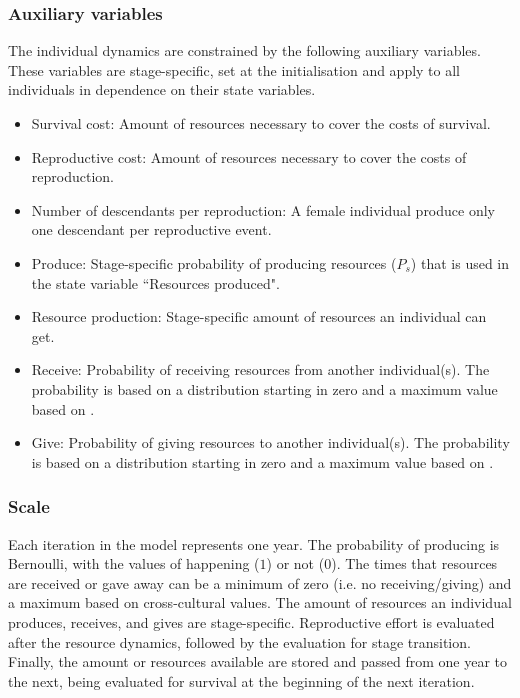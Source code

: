 \documentclass{article}
\begin{document}
\subsubsection{Auxiliary variables}

The individual dynamics are constrained by the following auxiliary variables. These variables are stage-specific, set at the initialisation and apply to all individuals in dependence on their state variables.

\begin{itemize}
    \item Survival cost: Amount of resources necessary to cover the costs of survival.
    \item Reproductive cost: Amount of resources necessary to cover the costs of reproduction.
    \item Number of descendants per reproduction: A female individual produce only one descendant per reproductive event.
    \item Produce: Stage-specific probability of producing resources ($P_s$) that is used in the state variable ``Resources produced".
    \item Resource production: Stage-specific amount of resources an individual can get.
    \item Receive: Probability of receiving resources from another individual(s). The probability is based on a distribution starting in zero and a maximum value based on \cite{gurven2004give}.
    \item Give: Probability of giving resources to another individual(s). The probability is based on a distribution starting in zero and a maximum value based on \cite{gurven2004give}.
\end{itemize}

\subsubsection{Scale}

Each iteration in the model represents one year. The probability  of producing is Bernoulli, with the values of happening ($1$) or not ($0$). The times that resources are received or gave away can be a minimum of zero (i.e. no receiving/giving) and a maximum based on cross-cultural values. The amount of resources an individual produces, receives, and gives are stage-specific. Reproductive effort is evaluated after the resource dynamics, followed by the evaluation for stage transition. Finally, the amount or resources available are stored and passed from one year to the next, being evaluated for survival at the beginning of the next iteration.
\end{document}
